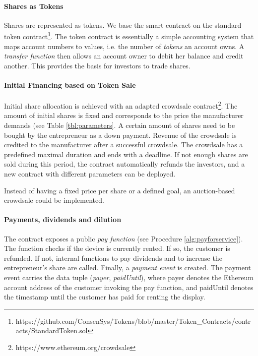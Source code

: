 \paragraph{Shares as Tokens}

Shares are represented as tokens. We base the smart contract on the standard token contract\footnote{https://github.com/ConsenSys/Tokens/blob/master/Token\_Contracts/contracts/StandardToken.sol}. The token contract is essentially a simple accounting system that maps account numbers to values, i.e. the number of \emph{tokens} an account owns. A \emph{transfer function} then allows an account owner to debit her balance and credit another. This provides the basis for investors to trade shares. 

\paragraph{Initial Financing based on Token Sale}

Initial share allocation is achieved with an adapted crowdsale contract\footnote{https://www.ethereum.org/crowdsale}. The amount of initial shares is fixed and corresponds to the price the manufacturer demands (see Table \ref{tbl:parameters}. A certain amount of shares need to be bought by the entrepreneur as a down payment. Revenue of the crowdsale is credited to the manufacturer after a successful crowdsale. The crowdsale has a predefined maximal duration and ends with a deadline. If not enough shares are sold during this period, the contract automatically refunds the investors, and a new contract with different parameters can be deployed.

Instead of having a fixed price per share or a defined goal, an auction-based crowdsale could be implemented.

\paragraph{Payments, dividends and dilution}

The contract exposes a public \emph{pay function} (see Procedure \ref{alg:payforservice}). The function checks if the device is currently rented. If so, the customer is refunded. If not, internal functions to pay dividends and to increase the entrepreneur's share are called. Finally, a \emph{payment event} is created. The payment event carries the data tuple (\emph{payer}, \emph{paidUntil}), where payer denotes the Ethereum account address of the customer invoking the pay function, and paidUntil denotes the timestamp until the customer has paid for renting the display. 

